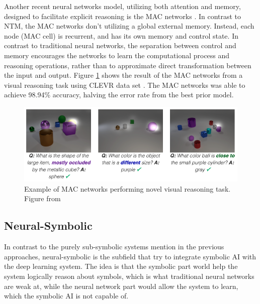 \documentclass[journal]{IEEEtran}
\begin{document}
Another recent neural networks model, utilizing both attention and memory, designed to facilitate explicit reasoning is the MAC networks \cite{hudson2018compositional}.
In contrast to NTM, the MAC networks don't utilizing a global external memory. Instead, each node (MAC cell) is recurrent, and has its own memory and control state.
In contrast to traditional neural networks, the separation between control and memory encourages the networks to 
learn the computational process and reasoning operations, rather than to approximate direct transformation between the input and output.
Figure \ref{mac-clevr} shows the result of the MAC networks from a visual reasoning task using CLEVR data set \cite{johnson2017clevr}. 
The MAC networks was able to achieve 98.94\% accuracy, halving the error rate from the best prior model.
\begin{figure}[htb]
  \includegraphics[width=\linewidth]{mac-clevr.png}
  \caption{Example of MAC networks performing novel visual reasoning task. Figure from \cite{hudson2018compositional}}
  \label{mac-clevr}
\end{figure}

\subsection{Neural-Symbolic}

In contrast to the purely sub-symbolic systems mention in the previous approaches, neural-symbolic is the subfield that try to integrate symbolic AI with the deep learning system. 
The idea is that the symbolic part world help the system logically reason about symbols, which is what traditional neural networks are weak at, 
while the neural network part would allow the system to learn, which the symbolic AI is not capable of.
\end{document}
